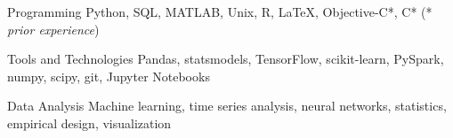 

\begin{cvskills}

  \cvskill
    {Programming} %
    {Python, SQL, MATLAB, Unix, R, \LaTeX, Objective-C*, C* (* \textit{prior experience})} %

  \cvskill
    {Tools and Technologies} %
    {Pandas, statsmodels, TensorFlow, scikit-learn, PySpark, numpy, scipy, git, Jupyter Notebooks} %

  \cvskill
    {Data Analysis} %
    {Machine learning, time series analysis, neural networks, statistics, empirical design, visualization} %

\end{cvskills}
